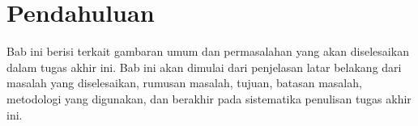 \chapter{Pendahuluan}

Bab ini berisi terkait gambaran umum dan permasalahan yang akan diselesaikan dalam tugas akhir ini. Bab ini akan dimulai dari penjelasan latar belakang dari masalah yang diselesaikan, rumusan masalah, tujuan, batasan masalah, metodologi yang digunakan, dan berakhir pada sistematika penulisan tugas akhir ini.







